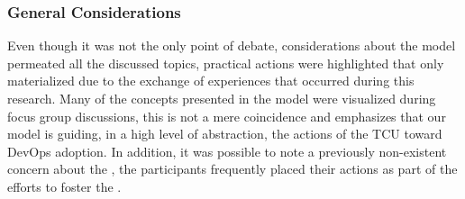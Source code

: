 \subsubsection{General Considerations}

Even though it was not the only point of debate, considerations about the model
permeated all the discussed topics, practical actions were highlighted that only
materialized due to the exchange of experiences that occurred during this
research. Many of the concepts presented in the model were visualized during
focus group discussions, this is not a mere coincidence and emphasizes that our
model is guiding, in a high level of abstraction, the actions of the TCU toward
DevOps adoption. In addition, it was possible to note a previously non-existent
concern about the \cc, the participants frequently placed their actions as part
of the efforts to foster the \cc.
